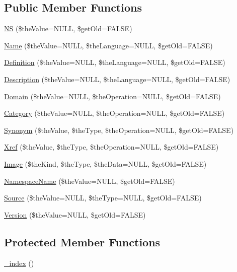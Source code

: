 \subsection*{Public Member Functions}
\begin{DoxyCompactItemize}
\item 
\hyperlink{class_c_term_a59a271c34a9f579bcf3177b392b6e31a}{N\-S} (\$the\-Value=N\-U\-L\-L, \$get\-Old=F\-A\-L\-S\-E)
\item 
\hyperlink{class_c_term_a67e5776ea8799b3e68d2ed9ca6dcde58}{Name} (\$the\-Value=N\-U\-L\-L, \$the\-Language=N\-U\-L\-L, \$get\-Old=F\-A\-L\-S\-E)
\item 
\hyperlink{class_c_term_a8452d05aa9a6687b0d2040158c58ea53}{Definition} (\$the\-Value=N\-U\-L\-L, \$the\-Language=N\-U\-L\-L, \$get\-Old=F\-A\-L\-S\-E)
\item 
\hyperlink{class_c_term_ac4193d704a54fbf35950151a36785103}{Description} (\$the\-Value=N\-U\-L\-L, \$the\-Language=N\-U\-L\-L, \$get\-Old=F\-A\-L\-S\-E)
\item 
\hyperlink{class_c_term_a2527808f249d6880b327e08a9cce0911}{Domain} (\$the\-Value=N\-U\-L\-L, \$the\-Operation=N\-U\-L\-L, \$get\-Old=F\-A\-L\-S\-E)
\item 
\hyperlink{class_c_term_a6ab25cb91c1a6de266e58ccad919ffba}{Category} (\$the\-Value=N\-U\-L\-L, \$the\-Operation=N\-U\-L\-L, \$get\-Old=F\-A\-L\-S\-E)
\item 
\hyperlink{class_c_term_adcaa8d79afde98b3d8bb76fbc894903f}{Synonym} (\$the\-Value, \$the\-Type, \$the\-Operation=N\-U\-L\-L, \$get\-Old=F\-A\-L\-S\-E)
\item 
\hyperlink{class_c_term_a0bbae7d5db15ba2b8aa94a17b441e366}{Xref} (\$the\-Value, \$the\-Type, \$the\-Operation=N\-U\-L\-L, \$get\-Old=F\-A\-L\-S\-E)
\item 
\hyperlink{class_c_term_abbbe3ae5901bbe1f83a2a2fe8e68df99}{Image} (\$the\-Kind, \$the\-Type, \$the\-Data=N\-U\-L\-L, \$get\-Old=F\-A\-L\-S\-E)
\item 
\hyperlink{class_c_term_af22cc12b6c41be83911b4cc4c5e54f94}{Namespace\-Name} (\$the\-Value=N\-U\-L\-L, \$get\-Old=F\-A\-L\-S\-E)
\item 
\hyperlink{class_c_term_a29c198c2f3c14c619d31b834639ad2fd}{Source} (\$the\-Value=N\-U\-L\-L, \$the\-Type=N\-U\-L\-L, \$get\-Old=F\-A\-L\-S\-E)
\item 
\hyperlink{class_c_term_ac9ffbfd23d67c874c47ccbff036c916b}{Version} (\$the\-Value=N\-U\-L\-L, \$get\-Old=F\-A\-L\-S\-E)
\end{DoxyCompactItemize}
\subsection*{Protected Member Functions}
\begin{DoxyCompactItemize}
\item 
\hyperlink{class_c_term_a7524effdc0db8f5ca045f306e3b6b50e}{\-\_\-index} ()
\end{DoxyCompactItemize}


